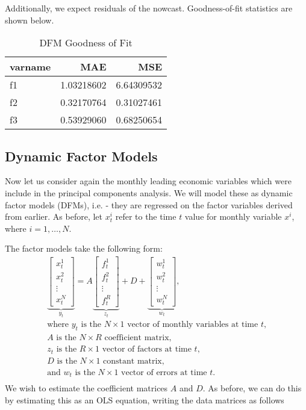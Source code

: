 \documentclass[11pt, letterpaper]{article}\usepackage[]{graphicx}\usepackage[]{color}
\begin{document}
Additionally, we expect residuals of the nowcast. Goodness-of-fit statistics are shown below.
\begin{table}[H]
\centering
\begingroup\footnotesize
\begin{tabular}{lrr}
  \hline
varname & MAE & MSE \\ 
  \hline
f1 & 1.03218602 & 6.64309532 \\ 
  f2 & 0.32170764 & 0.31027461 \\ 
  f3 & 0.53929060 & 0.68250654 \\ 
   \hline
\end{tabular}
\endgroup
\caption{DFM Goodness of Fit} 
\end{table}




\subsection{Dynamic Factor Models}
Now let us consider again the monthly leading economic variables which were include in the principal components analysis. We will model these as dynamic factor models (DFMs), i.e. - they are regressed on the factor variables derived from earlier. As before, let $x^i_t$ refer to the time $t$ value for monthly variable $x^i$, where $i = 1, \dots, N$.

The factor models take the following form:
\begin{align*}
\underbrace{\begin{bmatrix}
	x^1_t\\
	x^2_t\\
	\vdots \\
	x^N_t
\end{bmatrix}}_{y_t}
=
A
\underbrace{\begin{bmatrix}
	f^1_{t}\\
	f^2_{t}\\
	\vdots \\
	f^R_{t}
\end{bmatrix}}_{z_t}
+
D 
+
\underbrace{\begin{bmatrix}
	w^1_t\\
	w^2_t\\
	\vdots\\
	w^N_t
\end{bmatrix}}_{w_t},\\
\text{where $y_t$ is the $N \times 1$ vector of monthly variables at time $t$,}\\
\text{$A$ is the $N \times R$ coefficient matrix,}\\
\text{$z_t$ is the $R \times 1$ vector of factors at time $t$,}\\
\text{$D$ is the $N \times 1$ constant matrix,}\\
\text{and $w_t$ is the $N \times 1$ vector of errors at time $t$.}\\
\end{align*}
We wish to estimate the coefficient matrices $A$ and $D$. As before, we can do this by estimating this as an OLS equation, writing the data matrices as follows
\end{document}
